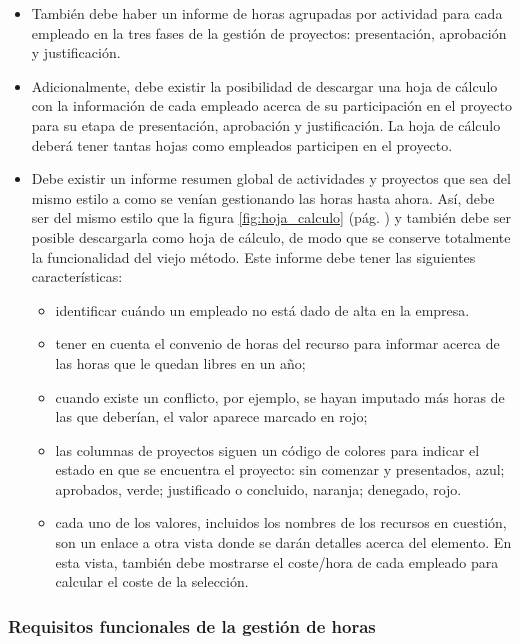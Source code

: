 \begin{itemize}
\item También debe haber un informe de horas agrupadas por actividad para cada
empleado en la tres fases de la gestión de proyectos: presentación,
aprobación y justificación.

\item Adicionalmente, debe existir la posibilidad de descargar una hoja de
cálculo con la información de cada empleado acerca de su participación en el
proyecto para su etapa de presentación, aprobación y justificación. La hoja de
cálculo deberá tener tantas hojas como empleados participen en el proyecto.

\item Debe existir un informe resumen global de actividades y proyectos que sea
del mismo estilo a como se venían gestionando las horas hasta ahora. Así, debe
ser del mismo estilo que la figura \ref{fig:hoja_calculo} (pág.
\pageref{fig:hoja_calculo}) y también debe ser posible descargarla como hoja de
cálculo, de modo que se conserve totalmente la funcionalidad del viejo método.
Este informe debe tener las siguientes características:
 \begin{itemize}
  \item identificar cuándo un empleado no está dado de alta en la empresa.

  \item tener en cuenta el convenio de horas del recurso para informar acerca
  de las horas que le quedan libres en un año;

  \item cuando existe un conflicto, por ejemplo, se hayan imputado más horas
  de las que deberían, el valor aparece marcado en rojo;

  \item las columnas de proyectos siguen un código de colores para indicar el
  estado en que se encuentra el proyecto: sin comenzar y presentados, azul;
aprobados, verde; justificado o concluido, naranja; denegado, rojo.

  \item cada uno de los valores, incluidos los nombres de los recursos en
  cuestión, son un enlace a otra vista donde se darán detalles acerca
  del elemento.  En esta vista, también debe mostrarse el coste/hora de
  cada empleado para calcular el coste de la selección.
 \end{itemize}

\end{itemize}


\subsubsection{Requisitos funcionales de la gestión de horas}
\label{sec:requisitos_gestion_horas}

